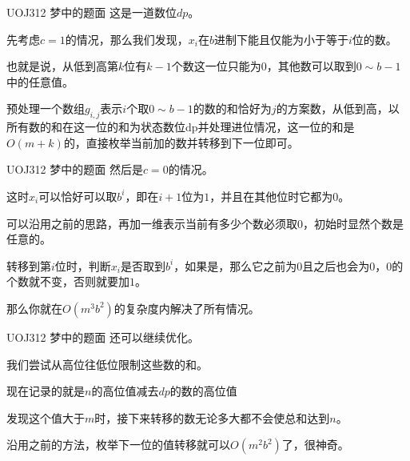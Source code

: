 \documentclass[9pt]{beamer}
\begin{document}
  \begin{frame}{UOJ312 梦中的题面}
     这是一道数位$dp$。
    
     先考虑$c=1$的情况，那么我们发现，$x_i$在$b$进制下能且仅能为小于等于$i$位的数。
    
     也就是说，从低到高第$k$位有$k-1$个数这一位只能为$0$，其他数可以取到$0\sim b-1$中的任意值。
    
     预处理一个数组$g_{i,j}$表示$i$个取$0\sim b-1$的数的和恰好为$j$的方案数，从低到高，以所有数的和在这一位的和为状态数位dp并处理进位情况，这一位的和是$O(m+k)$的，直接枚举当前加的数并转移到下一位即可。
  \end{frame}
    
  \begin{frame}{UOJ312 梦中的题面}
     然后是$c=0$的情况。
    
     这时$x_i$可以恰好可以取$b^i$，即在$i+1$位为$1$，并且在其他位时它都为$0$。
    
     可以沿用之前的思路，再加一维表示当前有多少个数必须取$0$，初始时显然个数是任意的。
    
     转移到第$i$位时，判断$x_i$是否取到$b^i$，如果是，那么它之前为$0$且之后也会为$0$，$0$的个数就不变，否则就要加$1$。
    
     那么你就在$O(m^3b^2)$的复杂度内解决了所有情况。
  \end{frame}
    
  \begin{frame}{UOJ312 梦中的题面}
     还可以继续优化。
    
     我们尝试从高位往低位限制这些数的和。
    
     现在记录的就是$n$的高位值减去$dp$的数的高位值
    
     发现这个值大于$m$时，接下来转移的数无论多大都不会使总和达到$n$。
    
     沿用之前的方法，枚举下一位的值转移就可以$O(m^2b^2)$了，很神奇。
  \end{frame}
\end{document}
